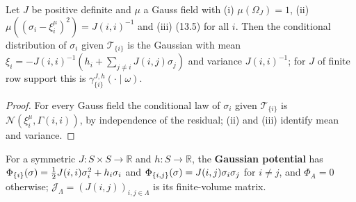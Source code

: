 \begin{lemma}[Georgii (13.10)]
    \label{lem:gf-13-10}
    \leanok

    Let $J$ be positive definite and $\mu$ a Gauss field with (i) $\mu(\Omega_J) = 1$,
    (ii) $\mu((\sigma_i - \xi_i^\mu)^2) = J(i,i)^{-1}$ and (iii) (13.5) for all $i$. Then the
    conditional distribution of $\sigma_i$ given $\mathcal T_{\{i\}}$ is the Gaussian with mean
    $\xi_i = -J(i,i)^{-1}(h_i + \sum_{j\neq i}J(i,j)\sigma_j)$ and variance $J(i,i)^{-1}$; for $J$
    of finite row support this is $\gamma^{J,h}_{\{i\}}(\cdot \mid \omega)$.
\end{lemma}
\begin{proof}
    \leanok
    For every Gauss field the conditional law of $\sigma_i$ given $\mathcal T_{\{i\}}$ is
    $\mathcal N(\xi_i^\mu, \Gamma(i,i))$, by independence of the residual; (ii) and (iii)
    identify mean and variance.
\end{proof}

\begin{definition}
    \label{def:gf-13-11}
    \leanok

    For a symmetric $J \colon S \times S \to \mathbb R$ and $h \colon S \to \mathbb R$, the
    \textbf{Gaussian potential} has $\Phi_{\left\{ i \right\}}(\sigma) = \tfrac12 J(i,i)\sigma_i^2 + h_i\sigma_i$
    and $\Phi_{\left\{ i,j \right\}}(\sigma) = J(i,j)\sigma_i\sigma_j$ for $i \neq j$, and $\Phi_A = 0$
    otherwise; $\mathcal J_\Lambda = (J(i,j))_{i,j\in\Lambda}$ is its finite-volume matrix.
\end{definition}

